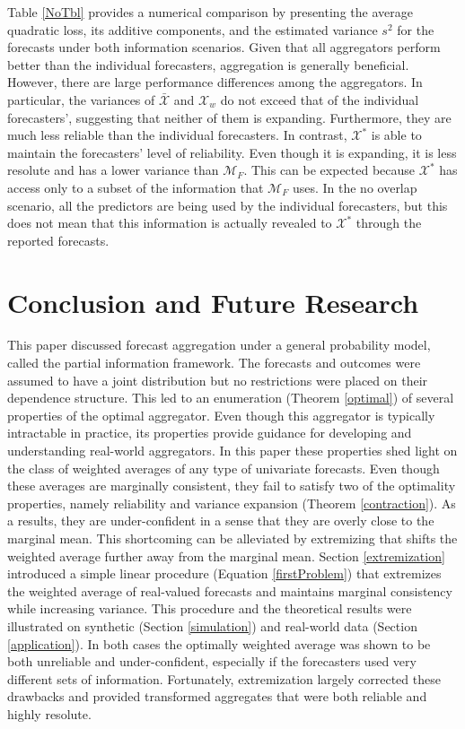 \documentclass[11pt]{article}
\theoremstyle{definition}
\theoremstyle{definition}
\begin{document}
%
Table \ref{NoTbl} provides a numerical comparison by presenting the average quadratic loss, its additive components, and the estimated variance $s^2$ for the forecasts under both information scenarios. Given that all aggregators perform better than the individual forecasters, aggregation is generally beneficial. However, there are large performance differences among the aggregators. In particular, the variances of $\bar{\mathcal{X}}$ and $\mathcal{X}_w$  do not exceed that of the individual forecasters', suggesting that neither of them is expanding. Furthermore, they are much less reliable than the individual forecasters. In contrast, $\mathcal{X}^*$ is able to maintain the forecasters' level of reliability. Even though it is expanding, it is less resolute and has a lower variance than $\mathcal{M}_F$. This can be expected because $\mathcal{X}^*$ has access only to a subset of the information that $\mathcal{M}_F$ uses. In the no overlap scenario, all the predictors are being used by the individual forecasters, but this does not mean that this information is actually revealed to $\mathcal{X}^*$ through the reported forecasts. 

\section{Conclusion and Future Research} \label{conclusion}

This paper discussed forecast aggregation under a general probability model, called the partial information framework. The forecasts and outcomes were assumed to have a joint distribution but no restrictions were placed on their dependence structure. This led to an enumeration (Theorem \ref{optimal}) of several properties of the optimal aggregator. Even though this aggregator is typically intractable in practice, its properties provide guidance for developing and understanding real-world aggregators. In this paper these properties shed light on the class of weighted averages of any type of univariate forecasts. Even though these averages are marginally consistent, they fail to satisfy two of the optimality properties, namely reliability and variance expansion (Theorem \ref{contraction}). As a results, they are under-confident in a sense that they are overly close to the marginal mean. This shortcoming can be alleviated by extremizing that shifts the weighted average further away from the marginal mean.  Section \ref{extremization} introduced a simple linear procedure (Equation \ref{firstProblem}) that extremizes the weighted average of real-valued forecasts and maintains marginal consistency while increasing variance. This procedure and the theoretical results were illustrated on synthetic (Section \ref{simulation}) and real-world data (Section \ref{application}). In both cases the optimally weighted average was shown to be both unreliable and under-confident, especially if the forecasters used very different sets of information. Fortunately, extremization largely corrected these drawbacks and provided transformed aggregates that were both reliable and highly resolute. 
\end{document}
